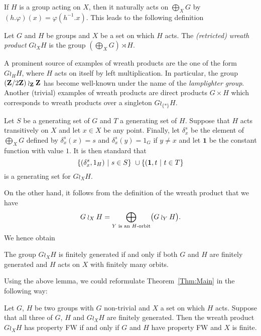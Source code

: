If $H$ is a group acting on $X$, then it naturally acts on $\bigoplus_XG$
by $(h.\varphi)(x)=\varphi(h^{-1}.x)$.
This leads to the following definition
\begin{defn}\label{Def:WreathProd}
Let $G$ and $H$ be groups and $X$ be a set on which $H$ acts.
The \emph{(retricted) wreath product} $G\wr_XH$ is the group $(\bigoplus_XG)\rtimes H$.
\end{defn}
A prominent  source of examples of wreath products are the one of the form $G\wr_HH$, where $H$ acts on itself by left multiplication.
In particular, the group $(\mathbf{Z}/2\mathbf{Z})\wr_{\mathbf{Z}}\mathbf{Z}$ has become well-known under the name of the \emph{lamplighter group}.
Another (trivial) examples of wreath products are direct products $G\times H$ which corresponds to wreath products over a singleton $G\wr_{\{*\}}H$.

Let $S$ be a generating set of $G$ and $T$ a generating set of $H$.
Suppose that $H$ acts transitively on $X$ and let $x\in X$ be any point.
Finally, let $\delta_x^s$ be the element of $\bigoplus_XG$ defined by $\delta_x^s(x)=s$ and $\delta_x^s(y)=1_G$ if $y\neq x$ and let $\mathbf 1$ be the constant function with value $1$.
It is then standard that 
\[
	\setst{(\delta_x^s,1_H)}{s \in S} \cup \setst{(\mathbf 1,t}{t \in T}
\]
is a generating set for $G\wr_XH$.

On the other hand, it follows from the definition of the wreath product that we have
\[
	G\wr_XH=\bigoplus_{Y\textnormal{ is an $H$-orbit}}\bigl(G\wr_YH\bigr).
\]
We hence obtain
%
%
\begin{lem}
The group $G\wr_XH$ is finitely generated if and only if both $G$ and $H$ are finitely generated and $H$ acts on $X$ with finitely many orbits.
\end{lem}
%
%
Using the above lemma, we could reformulate Theorem~\ref{Thm:Main} in the following way:
%
%
\begin{prop}
Let $G$, $H$ be two groups with $G$ non-trivial and $X$ a set on which $H$ acts. Suppose that all three of $G$, $H$ and $G\wr_XH$ are finitely generated. Then the wreath product $G\wr_XH$ has property FW if and only if $G$ and $H$ have property FW and $X$ is finite.
\end{prop}